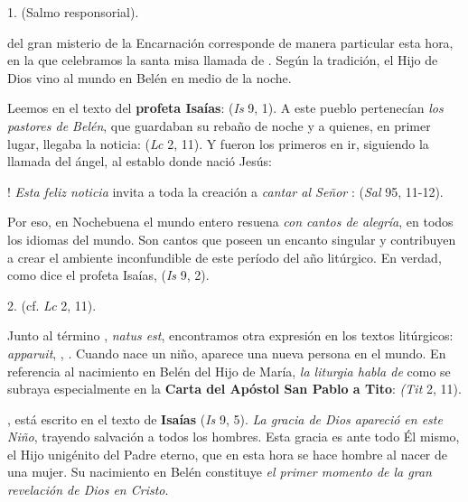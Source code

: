 \begin{body}
	1.  (Salmo responsorial).
	
	  del gran misterio de la Encarnación corresponde de manera particular esta hora, en la que celebramos la santa misa llamada de . Según la tradición, el Hijo de Dios vino al mundo en Belén en medio de la noche.
	
	Leemos en el texto del \textbf{profeta Isaías}:  (\emph{Is} 9, 1). A este pueblo pertenecían \emph{los pastores de Belén}, que guardaban su rebaño de noche y a quienes, en primer lugar, llegaba la noticia:  (\emph{Lc} 2, 11). Y fueron los primeros en ir, siguiendo la llamada del ángel, al establo donde nació Jesús:
	
	! \emph{Esta feliz noticia} invita a toda la creación a \emph{cantar al Señor} :  (\emph{Sal} 95, 11-12).
	
	Por eso, en Nochebuena el mundo entero resuena \emph{con cantos de alegría}, en todos los idiomas del mundo. Son cantos que poseen un encanto singular y contribuyen a crear el ambiente inconfundible de este período del año litúrgico. En verdad, como dice el profeta Isaías,  (\emph{Is} 9, 2).
	
	2.  (cf. \emph{Lc} 2, 11).
	
	Junto al término , \emph{natus est}, encontramos otra expresión en los textos litúrgicos: \emph{apparuit}, , . Cuando nace un niño, aparece una nueva persona en el mundo. En referencia al nacimiento en Belén del Hijo de María, \emph{la liturgia habla de}  como se subraya especialmente en la \textbf{Carta del Apóstol San Pablo a Tito}:  \emph{(Tit} 2, 11).
	
	, está escrito en el texto de \textbf{Isaías} (\emph{Is} 9, 5). \emph{La gracia de Dios apareció en este Niño}, trayendo salvación a todos los hombres. Esta gracia es ante todo Él mismo, el Hijo unigénito del Padre eterno, que en esta hora se hace hombre al nacer de una mujer. Su nacimiento en Belén constituye \emph{el primer momento de la gran revelación de Dios en Cristo}.
	

\end{body}
